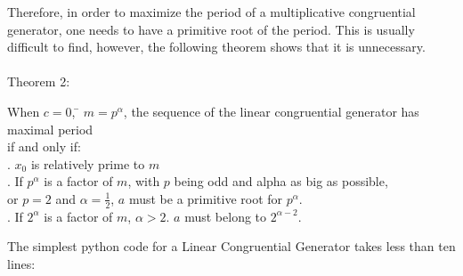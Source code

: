 \documentclass[12pt]{article}
\begin{document}
Therefore, in order to maximize the period of a multiplicative congruential generator, one needs to have a primitive root of the period. This is usually difficult to find, however, the following theorem shows that it is unnecessary.\\\\
Theorem 2:
\begin{tabbing}
When $c=0$, \= $m=p^\alpha$, the sequence of the linear congruential generator has maximal period\\
 if and only if:\\
. $x_0$ is relatively prime to $m$\\
. If $p^\alpha$ is a factor of $m$, with $p$ being odd and alpha as big as possible,\\
\>   or $p=2$ and $\alpha=\frac{1}{2}$, $a$ must be a primitive root for $p^\alpha$.\\
. If $2^\alpha$ is a factor of $m$, $\alpha>2$. $a$ must belong to $2^{\alpha-2}$. 
\end{tabbing}
The simplest python code for a Linear Congruential Generator takes less than ten lines:
\end{document}
